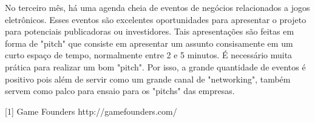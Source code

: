 No terceiro mês, há uma agenda cheia de eventos de negócios relacionados a jogos eletrônicos. Esses eventos são excelentes oportunidades para apresentar o projeto para potenciais publicadoras ou investidores. Tais apresentações são feitas em forma de "pitch" que consiste em apresentar um assunto consisamente em um curto espaço de tempo, normalmente entre 2 e 5 minutos. É necessário muita prática para realizar um bom "pitch". Por isso, a grande quantidade de eventos é positivo pois além de servir como um grande canal de "networking", também servem como palco para ensaio para os "pitchs" das empresas.


[1] Game Founders
http://gamefounders.com/
